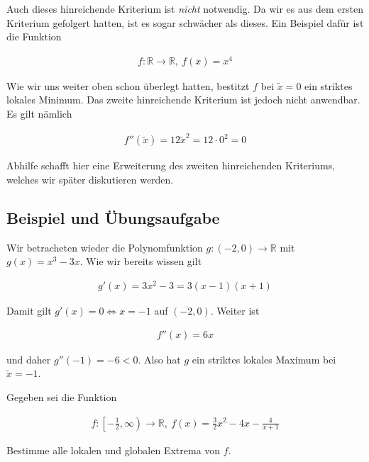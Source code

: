 \documentclass[fontsize=9pt,
               parskip=half-,
               DIV=14,
               listof=chapterentry,
               tocflat]{scrbook}
\begin{document}
\begin{warning*}
Auch dieses hinreichende Kriterium ist \emph{nicht} notwendig. Da wir es aus dem ersten Kriterium gefolgert hatten, ist es sogar schwächer als dieses. Ein Beispiel dafür ist die Funktion

\begin{align*}
f:\mathbb {R} \to \mathbb {R} ,\ f(x)=x^{4}
\end{align*}

Wie wir uns weiter oben schon überlegt hatten, bestitzt $f$ bei ${\tilde {x}}=0$ ein striktes lokales Minimum. Das zweite hinreichende Kriterium ist jedoch nicht anwendbar. Es gilt nämlich

\begin{align*}
f''({\tilde {x}})=12{\tilde {x}}^{2}=12\cdot 0^{2}=0
\end{align*}

Abhilfe schafft hier eine Erweiterung des zweiten hinreichenden Kriteriums, welches wir später diskutieren werden.

\end{warning*}

\subsection{Beispiel und Übungsaufgabe}

\begin{example*}
Wir betracheten wieder die Polynomfunktion $g:(-2,0)\to \mathbb {R} $ mit $g(x)=x^{3}-3x$. Wie wir bereits wissen gilt

\begin{align*}
g'(x)=3x^{2}-3=3(x-1)(x+1)
\end{align*}

Damit gilt $g'(x)=0\iff x=-1$ auf $(-2,0)$. Weiter ist

\begin{align*}
f''(x)=6x
\end{align*}

und daher $g''(-1)=-6<0$. Also hat $g$ ein striktes lokales Maximum bei ${\tilde {x}}=-1$.

\end{example*}
\clearpage
\begin{exercise*}
Gegeben sei die Funktion

\begin{align*}
f:\left[-{\tfrac {1}{2}},\infty \right)\to \mathbb {R} ,\ f(x)={\tfrac {3}{2}}x^{2}-4x-{\tfrac {4}{x+1}}
\end{align*}

Bestimme alle lokalen und globalen Extrema von $f$.

\end{exercise*}
\end{document}
